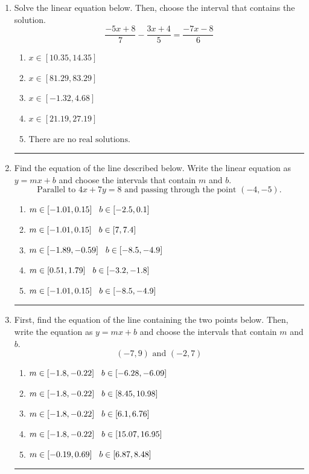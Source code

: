 \documentclass[14pt]{extbook}
\newcommand{\litem}[1]{\item#1\hspace*{-1cm}\rule{\textwidth}{0.4pt}}
\begin{document}
\begin{enumerate}
{\begin{enumerate}[label=\Alph*.]
\end{enumerate} }
\litem{
Solve the linear equation below. Then, choose the interval that contains the solution.\[ \frac{-5x + 8}{7} - \frac{3x + 4}{5} = \frac{-7x -8}{6} \]\begin{enumerate}[label=\Alph*.]
\item \( x \in [10.35, 14.35] \)
\item \( x \in [81.29, 83.29] \)
\item \( x \in [-1.32, 4.68] \)
\item \( x \in [21.19, 27.19] \)
\item \( \text{There are no real solutions.} \)

\end{enumerate} }
\litem{
Find the equation of the line described below. Write the linear equation as $ y=mx+b $ and choose the intervals that contain $m$ and $b$.\[ \text{Parallel to } 4 x + 7 y = 8 \text{ and passing through the point } (-4, -5). \]\begin{enumerate}[label=\Alph*.]
\item \( m \in [-1.01, 0.15] \hspace*{3mm} b \in [-2.5, 0.1] \)
\item \( m \in [-1.01, 0.15] \hspace*{3mm} b \in [7, 7.4] \)
\item \( m \in [-1.89, -0.59] \hspace*{3mm} b \in [-8.5, -4.9] \)
\item \( m \in [0.51, 1.79] \hspace*{3mm} b \in [-3.2, -1.8] \)
\item \( m \in [-1.01, 0.15] \hspace*{3mm} b \in [-8.5, -4.9] \)

\end{enumerate} }
\litem{
First, find the equation of the line containing the two points below. Then, write the equation as $ y=mx+b $ and choose the intervals that contain $m$ and $b$.\[ (-7, 9) \text{ and } (-2, 7) \]\begin{enumerate}[label=\Alph*.]
\item \( m \in [-1.8, -0.22] \hspace*{3mm} b \in [-6.28, -6.09] \)
\item \( m \in [-1.8, -0.22] \hspace*{3mm} b \in [8.45, 10.98] \)
\item \( m \in [-1.8, -0.22] \hspace*{3mm} b \in [6.1, 6.76] \)
\item \( m \in [-1.8, -0.22] \hspace*{3mm} b \in [15.07, 16.95] \)
\item \( m \in [-0.19, 0.69] \hspace*{3mm} b \in [6.87, 8.48] \)


\end{enumerate}}
\end{enumerate}
\end{document}
